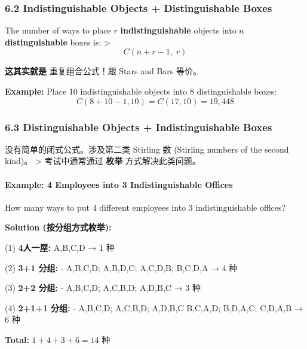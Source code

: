 \documentclass[10pt,a4paper,openany]{ctexbook}
\theoremstyle{definition}
\theoremstyle{remark}
\renewenvironment{quote}
  {\list{}{\leftmargin=1em\rightmargin=0pt\topsep=0.5pt\partopsep=0pt}\item[]}
  {\endlist}
\begin{document}
\subsubsection{6.2 Indistinguishable Objects + Distinguishable Boxes}

\begin{quote}
The number of ways to place $r$ \textbf{indistinguishable} objects into $n$ \textbf{distinguishable} boxes is:
>
\[
C(n + r - 1, \; r)
\]


\textbf{这其实就是} 重复组合公式！跟 Stars and Bars 等价。

\textbf{Example:} Place 10 indistinguishable objects into 8 distinguishable boxes:
\[
C(8 + 10 - 1, 10) = C(17, 10) = 19{,}448
\]


\end{quote}

\subsubsection{6.3 Distinguishable Objects + Indistinguishable Boxes}

\begin{quote}
没有简单的闭式公式。涉及第二类 Stirling 数 (Stirling numbers of the second kind)。
>
考试中通常通过 \textbf{枚举} 方式解决此类问题。

\end{quote}

\paragraph{Example: 4 Employees into 3 Indistinguishable Offices}

\begin{quote}
How many ways to put 4 different employees into 3 indistinguishable offices?

\textbf{Solution (按分组方式枚举):}

(1) \textbf{4人一屋:} {A,B,C,D} → 1 种

(2) \textbf{3+1 分组:}
- {A,B,C},{D}; {A,B,D},{C}; {A,C,D},{B}; {B,C,D},{A} → 4 种

(3) \textbf{2+2 分组:}
- {A,B},{C,D}; {A,C},{B,D}; {A,D},{B,C} → 3 种

(4) \textbf{2+1+1 分组:}
- {A,B},{C},{D}; {A,C},{B},{D}; {A,D},{B},{C}
{B,C},{A},{D}; {B,D},{A},{C}; {C,D},{A},{B} → 6 种

\textbf{Total:} $1 + 4 + 3 + 6 = 14$ 种

\end{quote}
\end{document}
